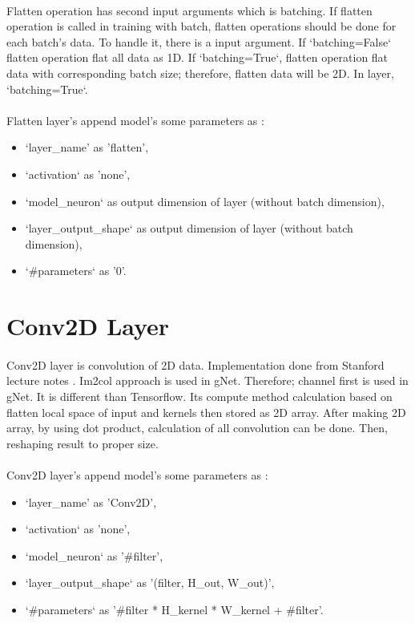 \documentclass[12pt]{report}
\begin{document}
\paragraph{}
Flatten operation has second input arguments which is batching. If flatten operation is called in training with batch, flatten operations should be done for each batch's data. To handle it, there is a input argument. If `batching=False` flatten operation flat all data as 1D. If `batching=True`, flatten operation flat data with corresponding batch size; therefore, flatten data will be 2D. In layer, `batching=True`.


\paragraph{}
Flatten layer's append model's some parameters as :
\begin{itemize}
	\item `layer\_name' as 'flatten',
	\item `activation` as 'none',
	\item `model\_neuron` as output dimension of layer (without batch dimension),
	\item `layer\_output\_shape` as output dimension of layer (without batch dimension),
	\item `\#parameters` as '0'.
\end{itemize}



\section{Conv2D Layer}

\paragraph{}
Conv2D layer is convolution of 2D data. Implementation done from Stanford lecture notes \cite{cs231}. Im2col approach is used in gNet. Therefore; channel first is used in gNet. It is different than Tensorflow. Its compute method calculation based on flatten local space of input and kernels then stored as 2D array. After making 2D array, by using dot product, calculation of all convolution can be done. Then, reshaping result to proper size. 

\paragraph{}
Conv2D layer's append model's some parameters as :
\begin{itemize}
	\item `layer\_name' as 'Conv2D',
	\item `activation` as 'none',
	\item `model\_neuron` as '\#filter',
	\item `layer\_output\_shape` as '(filter, H\_out, W\_out)',
	\item `\#parameters` as '\#filter * H\_kernel * W\_kernel + \#filter'.
\end{itemize}
\end{document}
